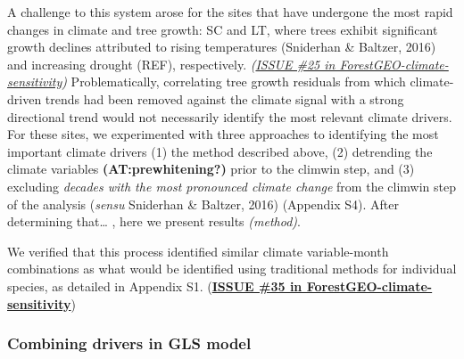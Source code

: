 \documentclass[
]{article}
\begin{document}
A challenge to this system arose for the sites that have undergone the
most rapid changes in climate and tree growth: SC and LT, where trees
exhibit significant growth declines attributed to rising temperatures
(Sniderhan \& Baltzer, 2016) and increasing drought (REF), respectively.
\emph{(\href{https://github.com/EcoClimLab/ForestGEO-climate-sensitivity/issues/25}{ISSUE
\#25 in ForestGEO-climate-sensitivity})} Problematically, correlating
tree growth residuals from which climate-driven trends had been removed
against the climate signal with a strong directional trend would not
necessarily identify the most relevant climate drivers. For these sites,
we experimented with three approaches to identifying the most important
climate drivers (1) the method described above, (2) detrending the
climate variables \textbf{(AT:prewhitening?)} prior to the climwin step,
and (3) excluding \emph{decades with the most pronounced climate change}
from the climwin step of the analysis (\emph{sensu} Sniderhan \&
Baltzer, 2016) (Appendix S4). After determining that\ldots{} , here we
present results \emph{(method)}.

We verified that this process identified similar climate variable-month
combinations as what would be identified using traditional methods for
individual species, as detailed in Appendix S1.
(\textbf{\href{https://github.com/EcoClimLab/ForestGEO-climate-sensitivity/issues/35}{ISSUE
\#35 in ForestGEO-climate-sensitivity}})

\hypertarget{combining-drivers-in-gls-model}{%
\subsubsection{Combining drivers in GLS
model}\label{combining-drivers-in-gls-model}}
\end{document}
